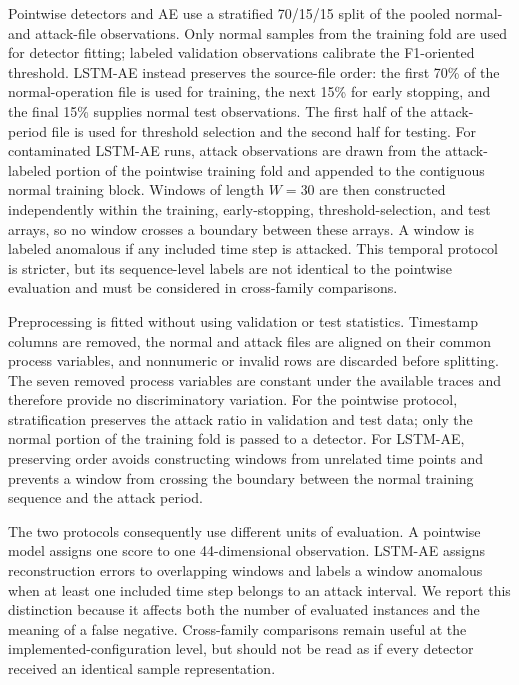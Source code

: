 \documentclass[10pt,conference]{IEEEtran}
\begin{document}
Pointwise detectors and AE use a stratified 70/15/15 split of the pooled normal- and attack-file observations. Only normal samples from the training fold are used for detector fitting; labeled validation observations calibrate the F1-oriented threshold. LSTM-AE instead preserves the source-file order: the first 70\% of the normal-operation file is used for training, the next 15\% for early stopping, and the final 15\% supplies normal test observations. The first half of the attack-period file is used for threshold selection and the second half for testing. For contaminated LSTM-AE runs, attack observations are drawn from the attack-labeled portion of the pointwise training fold and appended to the contiguous normal training block. Windows of length $W=30$ are then constructed independently within the training, early-stopping, threshold-selection, and test arrays, so no window crosses a boundary between these arrays. A window is labeled anomalous if any included time step is attacked. This temporal protocol is stricter, but its sequence-level labels are not identical to the pointwise evaluation and must be considered in cross-family comparisons.

Preprocessing is fitted without using validation or test statistics. Timestamp columns are removed, the normal and attack files are aligned on their common process variables, and nonnumeric or invalid rows are discarded before splitting. The seven removed process variables are constant under the available traces and therefore provide no discriminatory variation. For the pointwise protocol, stratification preserves the attack ratio in validation and test data; only the normal portion of the training fold is passed to a detector. For LSTM-AE, preserving order avoids constructing windows from unrelated time points and prevents a window from crossing the boundary between the normal training sequence and the attack period.

The two protocols consequently use different units of evaluation. A pointwise model assigns one score to one 44-dimensional observation. LSTM-AE assigns reconstruction errors to overlapping windows and labels a window anomalous when at least one included time step belongs to an attack interval. We report this distinction because it affects both the number of evaluated instances and the meaning of a false negative. Cross-family comparisons remain useful at the implemented-configuration level, but should not be read as if every detector received an identical sample representation.
\end{document}
